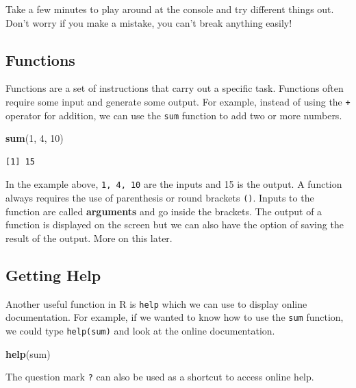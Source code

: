 \documentclass[]{book}
\newenvironment{Shaded}{\begin{snugshade}}{\end{snugshade}}
\newcommand{\KeywordTok}[1]{\textcolor[rgb]{0.13,0.29,0.53}{\textbf{#1}}}
\newcommand{\DecValTok}[1]{\textcolor[rgb]{0.00,0.00,0.81}{#1}}
\newcommand{\NormalTok}[1]{#1}
\theoremstyle{definition}
\theoremstyle{definition}
\theoremstyle{definition}
\theoremstyle{remark}
\begin{document}
Take a few minutes to play around at the console and try different
things out. Don't worry if you make a mistake, you can't break anything
easily!

\subsection{Functions}\label{functions}

Functions are a set of instructions that carry out a specific task.
Functions often require some input and generate some output. For
example, instead of using the \texttt{+} operator for addition, we can
use the \texttt{sum} function to add two or more numbers.

\begin{Shaded}
\begin{Highlighting}[]
\KeywordTok{sum}\NormalTok{(}\DecValTok{1}\NormalTok{, }\DecValTok{4}\NormalTok{, }\DecValTok{10}\NormalTok{)}
\end{Highlighting}
\end{Shaded}

\begin{verbatim}
[1] 15
\end{verbatim}

In the example above, \texttt{1,\ 4,\ 10} are the inputs and 15 is the
output. A function always requires the use of parenthesis or round
brackets \texttt{()}. Inputs to the function are called
\textbf{arguments} and go inside the brackets. The output of a function
is displayed on the screen but we can also have the option of saving the
result of the output. More on this later.

\subsection{Getting Help}\label{getting-help}

Another useful function in R is \texttt{help} which we can use to
display online documentation. For example, if we wanted to know how to
use the \texttt{sum} function, we could type \texttt{help(sum)} and look
at the online documentation.

\begin{Shaded}
\begin{Highlighting}[]
\KeywordTok{help}\NormalTok{(sum)}
\end{Highlighting}
\end{Shaded}

The question mark \texttt{?} can also be used as a shortcut to access
online help.
\end{document}
